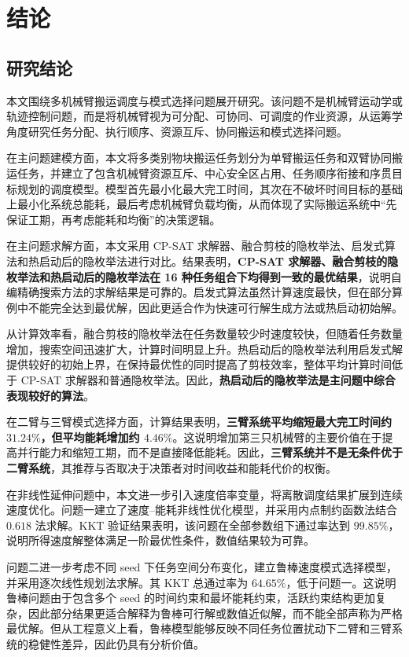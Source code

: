 \section{结论}

\subsection{研究结论}

本文围绕多机械臂搬运调度与模式选择问题展开研究。该问题不是机械臂运动学或轨迹控制问题，而是将机械臂视为可分配、可协同、可调度的作业资源，从运筹学角度研究任务分配、执行顺序、资源互斥、协同搬运和模式选择问题。

在主问题建模方面，本文将多类别物块搬运任务划分为单臂搬运任务和双臂协同搬运任务，并建立了包含机械臂资源互斥、中心安全区占用、任务顺序衔接和序贯目标规划的调度模型。模型首先最小化最大完工时间，其次在不破坏时间目标的基础上最小化系统总能耗，最后考虑机械臂负载均衡，从而体现了实际搬运系统中“先保证工期，再考虑能耗和均衡”的决策逻辑。

在主问题求解方面，本文采用 CP-SAT 求解器、融合剪枝的隐枚举法、启发式算法和热启动后的隐枚举法进行对比。结果表明，\textbf{CP-SAT 求解器、融合剪枝的隐枚举法和热启动后的隐枚举法在 16 种任务组合下均得到一致的最优结果}，说明自编精确搜索方法的求解结果是可靠的。启发式算法虽然计算速度最快，但在部分算例中不能完全达到最优解，因此更适合作为快速可行解生成方法或热启动初始解。

从计算效率看，融合剪枝的隐枚举法在任务数量较少时速度较快，但随着任务数量增加，搜索空间迅速扩大，计算时间明显上升。热启动后的隐枚举法利用启发式解提供较好的初始上界，在保持最优性的同时提高了剪枝效率，整体平均计算时间低于 CP-SAT 求解器和普通隐枚举法。因此，\textbf{热启动后的隐枚举法是主问题中综合表现较好的算法}。

在二臂与三臂模式选择方面，计算结果表明，\textbf{三臂系统平均缩短最大完工时间约 $31.24\%$，但平均能耗增加约 $4.46\%$}。这说明增加第三只机械臂的主要价值在于提高并行能力和缩短工期，而不是直接降低能耗。因此，\textbf{三臂系统并不是无条件优于二臂系统}，其推荐与否取决于决策者对时间收益和能耗代价的权衡。

在非线性延伸问题中，本文进一步引入速度倍率变量，将离散调度结果扩展到连续速度优化。问题一建立了速度--能耗非线性优化模型，并采用内点制约函数法结合 $0.618$ 法求解。KKT 验证结果表明，该问题在全部参数组下通过率达到 $99.85\%$，说明所得速度解整体满足一阶最优性条件，数值结果较为可靠。

问题二进一步考虑不同 seed 下任务空间分布变化，建立鲁棒速度模式选择模型，并采用逐次线性规划法求解。其 KKT 总通过率为 $64.65\%$，低于问题一。这说明鲁棒问题由于包含多个 seed 的时间约束和最坏能耗约束，活跃约束结构更加复杂，因此部分结果更适合解释为鲁棒可行解或数值近似解，而不能全部声称为严格最优解。但从工程意义上看，鲁棒模型能够反映不同任务位置扰动下二臂和三臂系统的稳健性差异，因此仍具有分析价值。

